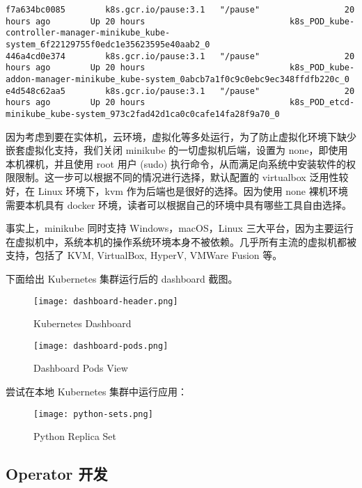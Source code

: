 \begin{lstlisting}
f7a634bc0085        k8s.gcr.io/pause:3.1   "/pause"                 20 hours ago        Up 20 hours                             k8s_POD_kube-controller-manager-minikube_kube-system_6f22129755f0edc1e35623595e40aab2_0
446a4cd0e374        k8s.gcr.io/pause:3.1   "/pause"                 20 hours ago        Up 20 hours                             k8s_POD_kube-addon-manager-minikube_kube-system_0abcb7a1f0c9c0ebc9ec348ffdfb220c_0
e4d548c62aa5        k8s.gcr.io/pause:3.1   "/pause"                 20 hours ago        Up 20 hours                             k8s_POD_etcd-minikube_kube-system_973c2fad42d1ca0c0cafe14fa28f9a70_0
\end{lstlisting}

因为考虑到要在实体机，云环境，虚拟化等多处运行，为了防止虚拟化环境下缺少嵌套虚拟化支持，我们关闭 minikube 的一切虚拟机后端，设置为 none，即使用本机裸机，并且使用 root 用户 (sudo) 执行命令，从而满足向系统中安装软件的权限限制。这一步可以根据不同的情况进行选择，默认配置的 virtualbox 泛用性较好，在 Linux 环境下，kvm 作为后端也是很好的选择。因为使用 none 裸机环境需要本机具有 docker 环境，读者可以根据自己的环境中具有哪些工具自由选择。

事实上，minikube 同时支持 Windows，macOS，Linux 三大平台，因为主要运行在虚拟机中，系统本机的操作系统环境本身不被依赖。几乎所有主流的虚拟机都被支持，包括了 KVM, VirtualBox, HyperV, VMWare Fusion 等。

下面给出 Kubernetes 集群运行后的 dashboard 截图。

\begin{figure}
    \texttt{[image: dashboard-header.png]}
    \caption{Kubernetes Dashboard}
\end{figure}

\begin{figure}
    \texttt{[image: dashboard-pods.png]}
    \caption{Dashboard Pods View}
\end{figure}

尝试在本地 Kubernetes 集群中运行应用：

\begin{figure}
    \texttt{[image: python-sets.png]}
    \caption{Python Replica Set}
\end{figure}


\subsection{Operator 开发}

